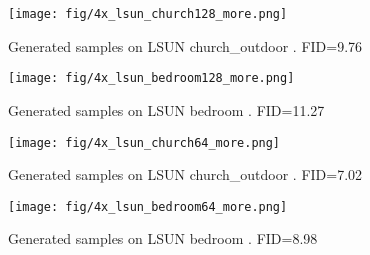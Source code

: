 \documentclass{article} \usepackage{iclr2021_conference,times}
\begin{document}
\begin{figure}[ht]
\begin{center}
\texttt{[image: fig/4x\_lsun\_church128\_more.png]}
\end{center}
\caption{Generated samples on LSUN church\_outdoor . FID=9.76}
\label{fig:church_128}
\end{figure}

\begin{figure}[ht]
\begin{center}
\texttt{[image: fig/4x\_lsun\_bedroom128\_more.png]}
\end{center}
\caption{Generated samples on LSUN bedroom . FID=11.27}
\label{fig:bedroom_128}
\end{figure}

\begin{figure}[ht]
\begin{center}
\texttt{[image: fig/4x\_lsun\_church64\_more.png]}
\end{center}
\caption{Generated samples on LSUN church\_outdoor . FID=7.02}
\label{fig:church_64}
\end{figure}

\begin{figure}[ht]
\begin{center}
\texttt{[image: fig/4x\_lsun\_bedroom64\_more.png]}
\end{center}
\caption{Generated samples on LSUN bedroom . FID=8.98}
\label{fig:bedroom_64}
\end{figure}
\end{document}
